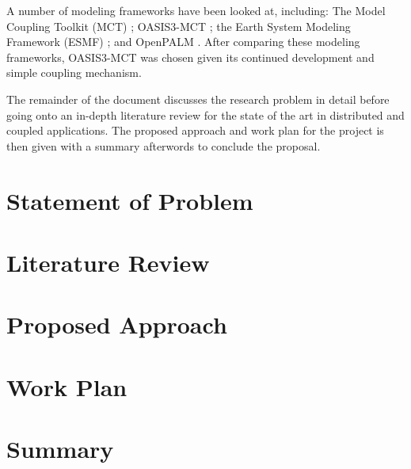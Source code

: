 \documentclass[a4paper,twocolumn,10pt]{article}
\begin{document}
A number of modeling frameworks have been looked at, including: The Model
Coupling Toolkit (MCT) \cite{Larson2005}; OASIS3-MCT \cite{Valcke,Valcke2013};
the Earth System Modeling Framework (ESMF) \cite{Ramework2004}; and OpenPALM
\cite{Piacentini2011}. After comparing these modeling frameworks, OASIS3-MCT was
chosen given its continued development and simple coupling mechanism.

The remainder of the document discusses the research problem in detail before
going onto an in-depth literature review for the state of the art in distributed
and coupled applications. The proposed approach and work plan for the project is
then given with a summary afterwords to conclude the proposal.

\section*{Statement of Problem}

\section*{Literature Review}

\section*{Proposed Approach}

\section*{Work Plan}

\section*{Summary}



\end{document}
